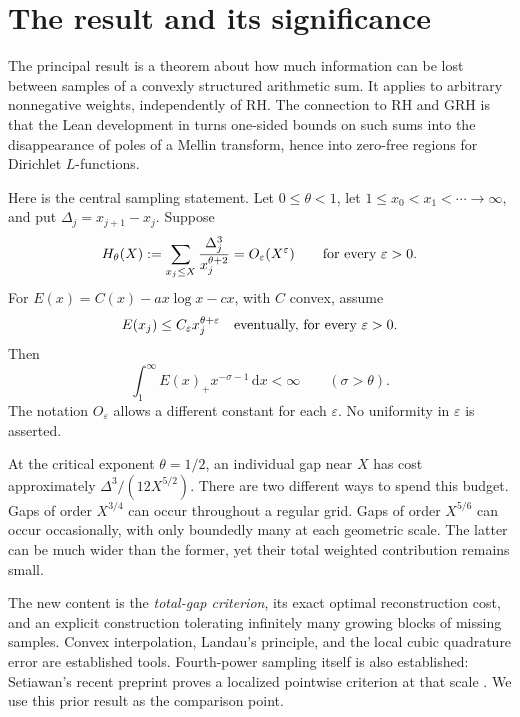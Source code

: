 \documentclass[11pt]{article}
\theoremstyle{definition}
\newcommand{\ep}{\varepsilon}
\newcommand{\dd}{\,\mathrm d}
\begin{document}
\section{The result and its significance}

The principal result is a theorem about how much information can be lost
between samples of a convexly structured arithmetic sum. It applies to
arbitrary nonnegative weights, independently of RH. The connection to RH
and GRH is that the Lean development in \cite{repo,guide,criterion} turns
one-sided bounds on such sums into the disappearance of poles of a Mellin
transform, hence into zero-free regions for Dirichlet \(L\)-functions.

Here is the central sampling statement. Let \(0\leq\theta<1\), let
\(1\leq x_0<x_1<\cdots\to\infty\), and put
\(\Delta_j=x_{j+1}-x_j\). Suppose
\begin{equation}\label{eq:headline-energy}
 H_\theta(X):=\sum_{x_j\leq X}
 \frac{\Delta_j^3}{x_j^{\theta+2}}
 =O_\ep(X^\ep)\qquad\hbox{for every }\ep>0.
\end{equation}
For \(E(x)=C(x)-ax\log x-cx\), with \(C\) convex, assume
\begin{equation}\label{eq:headline-samples}
 E(x_j)\leq C_\ep x_j^{\theta+\ep}
 \quad\hbox{eventually, for every }\ep>0.
\end{equation}
Then
\begin{equation}\label{eq:headline-conclusion}
 \int_1^\infty E(x)_+x^{-\sigma-1}\dd x<\infty
 \qquad(\sigma>\theta).
\end{equation}
The notation \(O_\ep\) allows a different constant for each \(\ep\).
No uniformity in \(\ep\) is asserted.

At the critical exponent \(\theta=1/2\), an individual gap near \(X\)
has cost approximately \(\Delta^3/(12X^{5/2})\). There are two different
ways to spend this budget. Gaps of order \(X^{3/4}\) can occur throughout
a regular grid. Gaps of order \(X^{5/6}\) can occur occasionally, with
only boundedly many at each geometric scale. The latter can be much wider
than the former, yet their total weighted contribution remains small.

The new content is the \emph{total-gap criterion}, its exact optimal
reconstruction cost, and an explicit construction tolerating infinitely
many growing blocks of missing samples. Convex interpolation, Landau's
principle, and the local cubic quadrature error are established tools.
Fourth-power sampling itself is also established: Setiawan's recent
preprint proves a localized pointwise criterion at that scale
\cite{setiawan}. We use this prior result as the comparison point.
\end{document}
